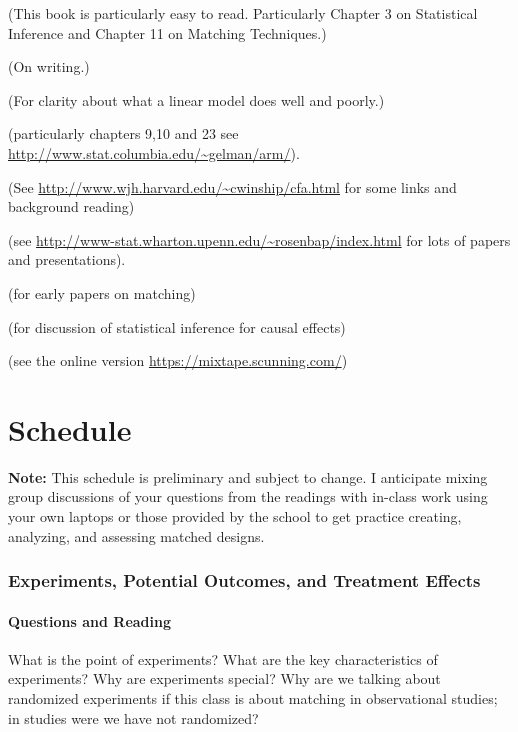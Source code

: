 \documentclass[10pt,letterpaper]{article}
\newenvironment{introstuff} {\setcounter{secnumdepth}{0}%
} {\setcounter{secnumdepth}{1}%
\restoregeometry
}
\begin{document}
\begin{introstuff}
   (This book is particularly easy to read. Particularly Chapter 3 on Statistical Inference and Chapter 11 on Matching Techniques.)

   (On writing.)


   (For clarity about what a linear model does well and poorly.)

    (particularly chapters 9,10 and 23 see \url{http://www.stat.columbia.edu/~gelman/arm/}).

   (See \url{http://www.wjh.harvard.edu/~cwinship/cfa.html} for some
  links and background reading)

   (see \url{http://www-stat.wharton.upenn.edu/~rosenbap/index.html} for lots of papers and presentations).

   (for early papers on matching)

   (for discussion of statistical inference for causal effects)

   (see the online version \url{https://mixtape.scunning.com/})

\end{introstuff}


  \part{Schedule}

  \textbf{Note: } This schedule is preliminary and subject to change. I
  anticipate mixing  group discussions of your questions from the readings with
  in-class work using your own laptops or those provided by the school to get
  practice creating, analyzing, and assessing matched designs.


\section{Experiments, Potential Outcomes, and Treatment Effects}

\subsection{Questions and Reading}

What is the point of experiments? What are the key characteristics of
experiments? Why are experiments special? Why are we talking about randomized
experiments if this class is about matching in observational studies; in
studies were we have not randomized?
\end{document}
